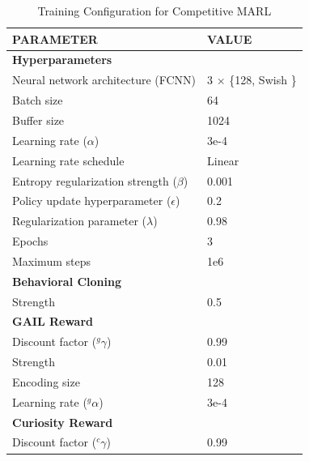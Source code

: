 \documentclass[letterpaper, 10 pt, conference]{ieeeconf}  %
\begin{document}
\begin{table}[t]
	\caption{Training Configuration for Competitive MARL}
	\begin{center}
		\begin{tabular}{l|l}
			\hline
			\textbf{PARAMETER}                        & \textbf{VALUE}        \\ \hline
			\multicolumn{2}{l}{\textbf{Hyperparameters}}                      \\ \hline
			Neural network architecture (FCNN)        & 3 $\times$ \{128, Swish \cite{ramachandran2017}\} \\
			Batch size                                & 64                    \\
			Buffer size                               & 1024                  \\
			Learning rate ($\alpha$)                  & 3e-4                  \\
			Learning rate schedule                    & Linear                \\
			Entropy regularization strength ($\beta$) & 0.001                 \\
			Policy update hyperparameter ($\epsilon$) & 0.2                   \\
			Regularization parameter ($\lambda$)      & 0.98                  \\
			Epochs                                    & 3                     \\
			Maximum steps                             & 1e6                   \\ \hline
			\multicolumn{2}{l}{\textbf{Behavioral Cloning}}                   \\ \hline
			Strength                                  & 0.5                   \\ \hline
			\multicolumn{2}{l}{\textbf{GAIL Reward}}                          \\ \hline
			Discount factor ($^{g}\gamma$)            & 0.99                  \\
			Strength                                  & 0.01                  \\
			Encoding size                             & 128                   \\
			Learning rate ($^{g}\alpha$)              & 3e-4                  \\ \hline
			\multicolumn{2}{l}{\textbf{Curiosity Reward}}                     \\ \hline
			Discount factor ($^{c}\gamma$)            & 0.99                  \\

\end{tabular}
\end{center}
\end{table}
\end{document}
